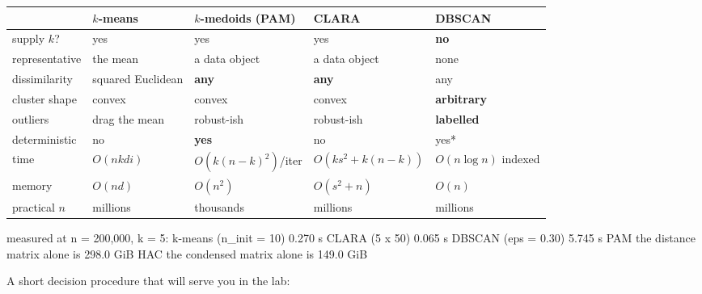 \documentclass[11pt]{article}
\begin{document}
\begin{center}\small
\begin{tabular}{lllll}
  \toprule
   & $k$-means & $k$-medoids (PAM) & CLARA & DBSCAN \\
  \midrule
  supply $k$?      & yes & yes & yes & \textbf{no} \\
  representative   & the mean & a data object & a data object & none \\
  dissimilarity    & squared Euclidean & \textbf{any} & \textbf{any} & any \\
  cluster shape    & convex & convex & convex & \textbf{arbitrary} \\
  outliers         & drag the mean & robust-ish & robust-ish
                   & \textbf{labelled} \\
  deterministic    & no & \textbf{yes} & no & yes* \\
  time             & $O(nkdi)$ & $O(k(n{-}k)^2)$/iter
                   & $O(ks^2 + k(n{-}k))$ & $O(n\log n)$ indexed \\
  memory           & $O(nd)$ & $O(n^2)$ & $O(s^2 + n)$ & $O(n)$ \\
  practical $n$    & millions & thousands & millions & millions \\
  \bottomrule
\end{tabular}
\end{center}


\begin{codeout}
  measured at n = 200,000, k = 5:
    k-means (n_init = 10)   0.270 s
    CLARA   (5 x 50)        0.065 s
    DBSCAN  (eps = 0.30)    5.745 s
    PAM     the distance matrix alone is 298.0 GiB
    HAC     the condensed matrix alone is 149.0 GiB
\end{codeout}

A short decision procedure that will serve you in the lab:
\end{document}
